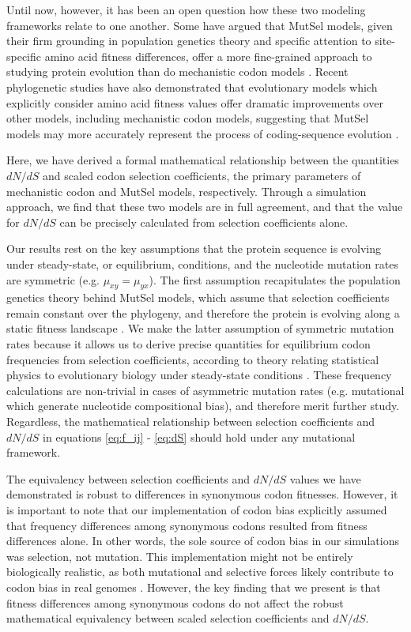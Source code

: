 \documentclass[11pt]{article}
\begin{document}
Until now, however, it has been an open question how these two modeling frameworks relate to one another. Some have argued that MutSel models, given their firm grounding in population genetics theory and specific attention to site-specific amino acid fitness differences, offer a more fine-grained approach to studying protein evolution than do mechanistic codon models \cite{HalpernBruno1998,Rodrigueetal2010}. Recent phylogenetic studies have also demonstrated that evolutionary models which explicitly consider amino acid fitness values offer dramatic improvements over other models, including mechanistic codon models, suggesting that MutSel models may more accurately represent the process of coding-sequence evolution \cite{Bloom2014a, Bloom2014b}. 

Here, we have derived a formal mathematical relationship between the quantities $dN/dS$ and scaled codon selection coefficients, the primary parameters of mechanistic codon and MutSel models, respectively. Through a simulation approach, we find that these two models are in full agreement, and that the value for $dN/dS$ can be precisely calculated from selection coefficients alone.

Our results rest on the key assumptions that the protein sequence is evolving under steady-state, or equilibrium, conditions, and the nucleotide mutation rates are symmetric (e.g. $\mu_{xy} = \mu_{yx}$). The first assumption recapitulates the population genetics theory behind MutSel models, which assume that selection coefficients remain constant over the phylogeny, and therefore the protein is evolving along a static fitness landscape \cite{HalpernBruno1998,Rodrigueetal2010,Tamurietal2012}. We make the latter assumption of symmetric mutation rates because it allows us to derive precise quantities for equilibrium codon frequencies from selection coefficients, according to theory relating statistical physics to evolutionary biology under steady-state conditions \cite{SellaHirsh2005,deVladar2011}. These frequency calculations are non-trivial in cases of asymmetric mutation rates (e.g. mutational which generate nucleotide compositional bias), and therefore merit further study. Regardless, the mathematical relationship between selection coefficients and $dN/dS$ in equations \eqref{eq:f_ij} - \eqref{eq:dS} should hold under any mutational framework.

The equivalency between selection coefficients and $dN/dS$ values we have demonstrated is robust to differences in synonymous codon fitnesses. However, it is important to note that our implementation of codon bias explicitly assumed that frequency differences among synonymous codons resulted from fitness differences alone. In other words, the sole source of codon bias in our simulations was selection, not mutation. This implementation might not be entirely biologically realistic, as both mutational and selective forces likely contribute to codon bias in real genomes \cite{Blumer1991, Duret2002, HershbergPetrov2008, PlotkinKudla2010}. However, the key finding that we present is that fitness differences among synonymous codons do not affect the robust mathematical equivalency between scaled selection coefficients and $dN/dS$. 
\end{document}
